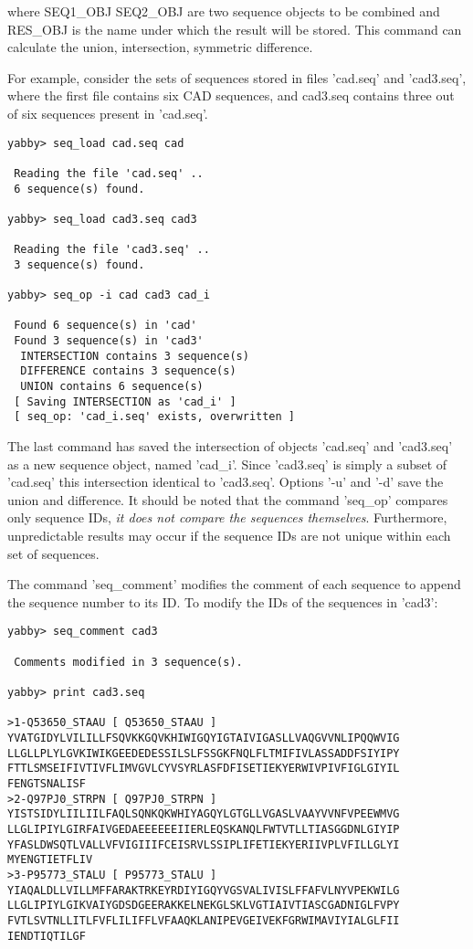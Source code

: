where SEQ1\_OBJ SEQ2\_OBJ are two sequence objects to be combined 
and RES\_OBJ is the name under which the result will be stored.
This command can calculate the union, intersection, symmetric
difference.

For example, consider the sets of sequences stored in files
'cad.seq' and 'cad3.seq', where the first file contains six 
CAD sequences, and cad3.seq contains three out of six sequences
present in 'cad.seq'.

\begin{verbatim}
yabby> seq_load cad.seq cad

 Reading the file 'cad.seq' ..
 6 sequence(s) found.

yabby> seq_load cad3.seq cad3

 Reading the file 'cad3.seq' ..
 3 sequence(s) found.

yabby> seq_op -i cad cad3 cad_i

 Found 6 sequence(s) in 'cad'
 Found 3 sequence(s) in 'cad3'
  INTERSECTION contains 3 sequence(s)
  DIFFERENCE contains 3 sequence(s)
  UNION contains 6 sequence(s)
 [ Saving INTERSECTION as 'cad_i' ]
 [ seq_op: 'cad_i.seq' exists, overwritten ]
\end{verbatim}

The last command has saved the intersection of objects 'cad.seq' and
'cad3.seq' as a new sequence object, named 'cad\_i'. Since 'cad3.seq'
is simply a subset of 'cad.seq' this intersection identical to
'cad3.seq'. Options '-u' and '-d' save the union and difference.
It should be noted that the command 'seq\_op' compares only
sequence IDs, {\em it does not compare the sequences themselves}.
Furthermore, unpredictable results may occur if the sequence IDs
are not unique within each set of sequences. 


The command 'seq\_comment' modifies the comment of each sequence
to append the sequence number to its ID. To modify the IDs of the
sequences in 'cad3':

\begin{verbatim}
yabby> seq_comment cad3

 Comments modified in 3 sequence(s).

yabby> print cad3.seq

>1-Q53650_STAAU [ Q53650_STAAU ]
YVATGIDYLVILILLFSQVKKGQVKHIWIGQYIGTAIVIGASLLVAQGVVNLIPQQWVIG
LLGLLPLYLGVKIWIKGEEDEDESSILSLFSSGKFNQLFLTMIFIVLASSADDFSIYIPY
FTTLSMSEIFIVTIVFLIMVGVLCYVSYRLASFDFISETIEKYERWIVPIVFIGLGIYIL
FENGTSNALISF
>2-Q97PJ0_STRPN [ Q97PJ0_STRPN ]
YISTSIDYLIILIILFAQLSQNKQKWHIYAGQYLGTGLLVGASLVAAYVVNFVPEEWMVG
LLGLIPIYLGIRFAIVGEDAEEEEEEIIERLEQSKANQLFWTVTLLTIASGGDNLGIYIP
YFASLDWSQTLVALLVFVIGIIIFCEISRVLSSIPLIFETIEKYERIIVPLVFILLGLYI
MYENGTIETFLIV
>3-P95773_STALU [ P95773_STALU ]
YIAQALDLLVILLMFFARAKTRKEYRDIYIGQYVGSVALIVISLFFAFVLNYVPEKWILG
LLGLIPIYLGIKVAIYGDSDGEERAKKELNEKGLSKLVGTIAIVTIASCGADNIGLFVPY
FVTLSVTNLLITLFVFLILIFFLVFAAQKLANIPEVGEIVEKFGRWIMAVIYIALGLFII
IENDTIQTILGF
\end{verbatim}

